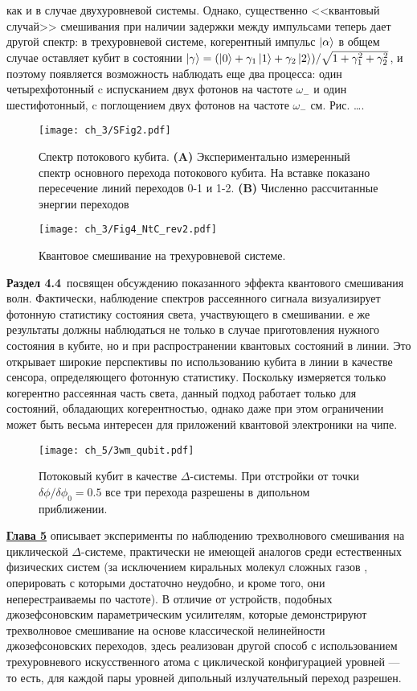 как и в случае двухуровневой системы. Однако, существенно <<квантовый случай>> смешивания при наличии задержки между импульсами теперь дает другой спектр: в трехуровневой системе, когерентный импульс $\ket{\alpha}$ в общем случае оставляет кубит в состоянии $\ket{\gamma} = (\ket{0}+\gamma_1\ket{1}+\gamma_2\ket{2})/\sqrt{1+\gamma_1^2+\gamma_2^2}$, и поэтому появляется возможность наблюдать еще два процесса: один четырехфотонный c испусканием двух фотонов на частоте $\omega_-$ и один шестифотонный, c поглощением двух фотонов на частоте $\omega_-$ см. Рис. \ldots. 
\begin{figure}[htb]\center
	\texttt{[image: ch\_3/SFig2.pdf]}
	\caption{Спектр потокового кубита. \textbf{(A)} Экспериментально измеренный спектр основного перехода потокового кубита. На вставке показано пересечение линий переходов 0-1 и 1-2.  \textbf{(B)} Численно рассчитанные энергии переходов}
	\label{fig: spectra_3ls}	
\end{figure}

\begin{figure}[htb]\center
	\texttt{[image: ch\_3/Fig4\_NtC\_rev2.pdf]}
	\caption{Квантовое смешивание на трехуровневой системе.}
	\label{fig: qwm_3ls}	
\end{figure}
\textbf{Раздел 4.4}~посвящен обсуждению показанного эффекта квантового смешивания волн. Фактически, наблюдение спектров рассеянного сигнала визуализирует фотонную статистику состояния света, участвующего в смешивании. е же результаты должны наблюдаться не только в случае приготовления нужного состояния в кубите, но и при распространении квантовых состояний в линии. Это открывает широкие перспективы по использованию кубита в линии в качестве сенсора, определяющего фотонную статистику. Поскольку измеряется только когерентно рассеянная часть света, данный подход работает только для состояний, обладающих когерентностью, однако даже при этом ограничении может быть весьма интересен для приложений квантовой электроники на чипе.
\begin{figure}[htb]\center
	\texttt{[image: ch\_5/3wm\_qubit.pdf]}
	\caption{Потоковый кубит в качестве $\Delta$-системы. При отстройки от точки~$\delta\phi/\delta\phi_0=0.5$ все три перехода разрешены в дипольном приближении. }
	\label{fig: 3wm_qubit}	
\end{figure}

\textbf{\underline{Глава 5}} описывает эксперименты по наблюдению трехволнового смешивания на циклической $\Delta$-системе, практически не имеющей аналогов среди естественных физических систем (за исключением киральных молекул сложных газов \cite{Chiral}, оперировать с которыми достаточно неудобно, и кроме того, они неперестраиваемы по частоте). В отличие от устройств, подобных джозефсоновским параметрическим усилителям, которые демонстрируют трехволновое смешивание на основе классической нелинейности джозефсоновских переходов, здесь реализован другой способ с использованием трехуровневого искусственного атома с циклической конфигурацией уровней --- то есть, для каждой пары уровней дипольный излучательный переход разрешен. 

